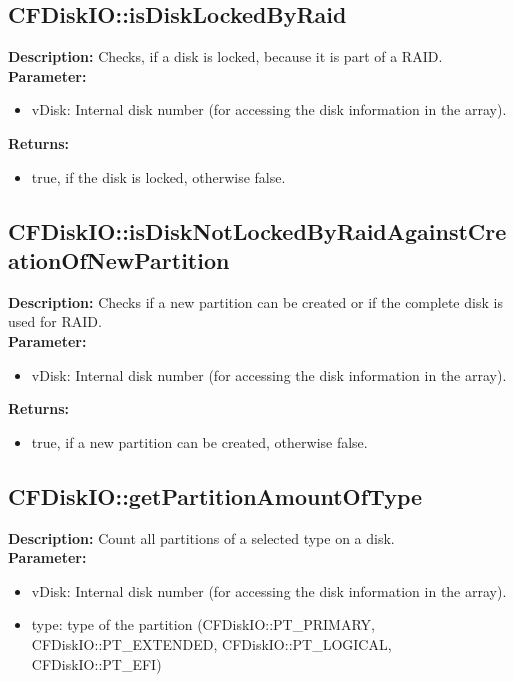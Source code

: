 \subsection{CFDiskIO::isDiskLockedByRaid}
\textbf{Description:} Checks, if a disk is locked, because it is part of a RAID.\\
\textbf{Parameter:}
\begin{itemize}
\item vDisk: Internal disk number (for accessing the disk information in the array).
\end{itemize}
\textbf{Returns:}
\begin{itemize}
\item true, if the disk is locked, otherwise false.
\end{itemize}

\subsection{CFDiskIO::isDiskNotLockedByRaidAgainstCreationOfNewPartition}
\textbf{Description:} Checks if a new partition can be created or if the complete disk is used for RAID.\\
\textbf{Parameter:}
\begin{itemize}
\item vDisk: Internal disk number (for accessing the disk information in the array).
\end{itemize}
\textbf{Returns:}
\begin{itemize}
\item true, if a new partition can be created, otherwise false.
\end{itemize}

\subsection{CFDiskIO::getPartitionAmountOfType}
\textbf{Description:} Count all partitions of a selected type on a disk.\\
\textbf{Parameter:}
\begin{itemize}
\item vDisk: Internal disk number (for accessing the disk information in the array).
\item type: type of the partition (CFDiskIO::PT\_PRIMARY, CFDiskIO::PT\_EXTENDED, CFDiskIO::PT\_LOGICAL, CFDiskIO::PT\_EFI)
\end{itemize}


